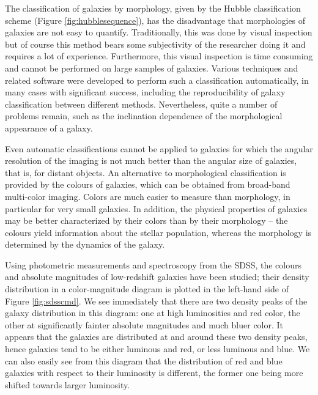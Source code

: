 \documentclass[a4paper,10pt]{article}
\begin{document}
{\noindent}The classification of galaxies by morphology, given by the Hubble classification scheme (Figure \ref{fig:hubblesequence}), has the disadvantage that morphologies of galaxies are not easy to quantify. Traditionally, this was done by visual inspection but of course this method bears some subjectivity of the researcher doing it and requires a lot of experience. Furthermore, this visual inspection is time consuming and cannot be performed on large samples of galaxies. Various techniques and related software were developed to perform such a classification automatically, in many cases with significant success, including the reproducibility of galaxy classification between different methods. Nevertheless, quite a number of problems remain, such as the inclination dependence of the morphological appearance of a galaxy.

{\noindent}Even automatic classifications cannot be applied to galaxies for which the angular resolution of the imaging is not much better than the angular size of galaxies, that is, for distant objects. An alternative to morphological classification is provided by the colours of galaxies, which can be obtained from broad-band multi-color imaging. Colors are much easier to measure than morphology, in particular for very small galaxies. In addition, the physical properties of galaxies may be better characterized by their colors than by their morphology -- the colours yield information about the stellar population, whereas the morphology is determined by the dynamics of the galaxy.

{\noindent}Using photometric measurements and spectroscopy from the SDSS, the colours and absolute magnitudes of low-redshift galaxies have been studied; their density distribution in a color-magnitude diagram is plotted in the left-hand side of Figure \ref{fig:sdsscmd}. We see immediately that there are two density peaks of the galaxy distribution in this diagram: one at high luminosities and red color, the other at significantly fainter absolute magnitudes and much bluer color. It appears that the galaxies are distributed at and around these two density peaks, hence galaxies tend to be either luminous and red, or less luminous and blue. We can also easily see from this diagram that the distribution of red and blue galaxies with respect to their luminosity is different, the former one being more shifted towards larger luminosity.
\end{document}
